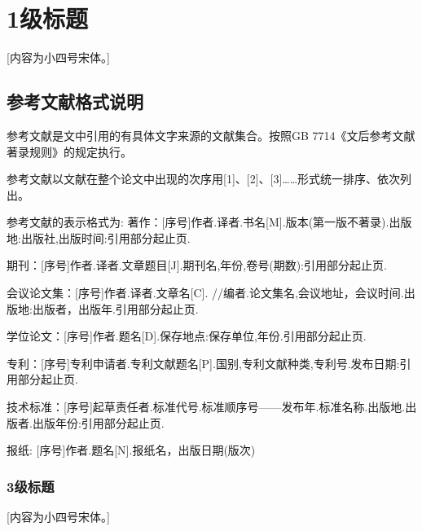  \setlength{\baselineskip}{20pt}
\chapter{1级标题}
\label{cha:chap3}

[内容为小四号宋体。] 

\section{参考文献格式说明}

参考文献是文中引用的有具体文字来源的文献集合。按照GB 7714《文后参考文献著录规则》的规定执行。

参考文献以文献在整个论文中出现的次序用[1]、[2]、[3]……形式统一排序、依次列出。

参考文献的表示格式为:
著作：[序号]作者.译者.书名[M].版本(第一版不著录).出版地:出版社,出版时间:引用部分起止页.

期刊：[序号]作者.译者.文章题目[J].期刊名,年份,卷号(期数):引用部分起止页.

会议论文集：[序号]作者.译者.文章名[C]. //编者.论文集名,会议地址，会议时间.出版地:出版者，出版年.引用部分起止页.

学位论文：[序号]作者.题名[D].保存地点:保存单位,年份.引用部分起止页.

专利：[序号]专利申请者.专利文献题名[P].国别,专利文献种类,专利号.发布日期:引用部分起止页.

技术标准：[序号]起草责任者.标准代号.标准顺序号——发布年.标准名称.出版地.出版者.出版年份:引用部分起止页.

报纸: [序号]作者.题名[N].报纸名，出版日期(版次)


\subsection{3级标题}

[内容为小四号宋体。] 